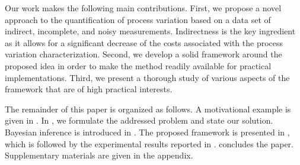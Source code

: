 Our work makes the following main contributions. First, we propose a novel approach to the quantification of process variation based on a data set of indirect, incomplete, and noisy measurements. Indirectness is the key ingredient as it allows for a significant decrease of the costs associated with the process variation characterization. Second, we develop a solid framework around the proposed idea in order to make the method readily available for practical implementations. Third, we present a thorough study of various aspects of the framework that are of high practical interests.

The remainder of this paper is organized as follows. A motivational example is given in . In , we formulate the addressed problem and state our solution. Bayesian inference is introduced in . The proposed framework is presented in , which is followed by the experimental results reported in .  concludes the paper. Supplementary materials are given in the appendix.
